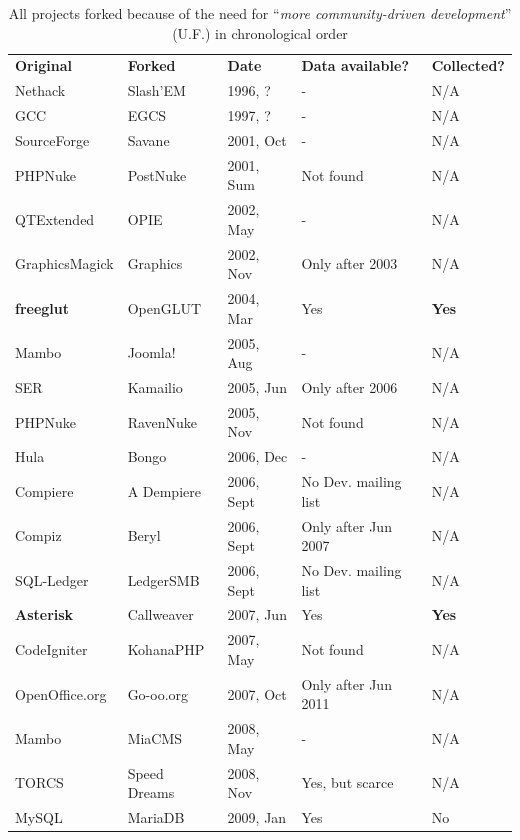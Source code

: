 \documentclass{acm_proc_article-sp}
\begin{document}
\begin{table} [!Ht]
\centering
\caption{All projects forked because of the need for ``\textit{more community-driven development}'' (U.F.) \cite{Robles} in chronological order}
\label{tableProjectsForkedCat2CommunityDriven}
\begin{tabular}{m{} m{} m{} m{} m{}}
\hline\noalign{\smallskip}
\textbf{Original} & \textbf{Forked} & \textbf{Date} & \textbf{Data available?} & \textbf{Collected?}\\
\noalign{\smallskip}\hline\noalign{\smallskip}
Nethack & Slash'EM & 1996, ? & - & N/A \\ \hline
GCC & EGCS & 1997, ? & - & N/A \\ \hline
SourceForge & Savane & 2001, Oct & - & N/A \\ \hline
PHPNuke & PostNuke & 2001, Sum & Not found & N/A \\ \hline
QTExtended & OPIE & 2002, May & - & N/A \\ \hline
GraphicsMagick & Graphics & 2002, Nov  & Only after 2003 & N/A \\ \hline
\textbf{freeglut} & OpenGLUT & 2004, Mar & Yes & \textbf{Yes} \\ \hline
Mambo & Joomla! & 2005, Aug & - & N/A \\ \hline
SER & Kamailio & 2005, Jun & Only after 2006 & N/A \\ \hline
PHPNuke & RavenNuke & 2005, Nov & Not found & N/A \\ \hline
Hula & Bongo & 2006, Dec & - & N/A \\ \hline
Compiere & A Dempiere & 2006, Sept & No Dev. mailing list & N/A \\ \hline
Compiz & Beryl & 2006, Sept & Only after Jun 2007 & N/A \\ \hline
SQL-Ledger & LedgerSMB & 2006, Sept & No Dev. mailing list & N/A \\ \hline
\textbf{Asterisk} & Callweaver & 2007, Jun & Yes & \textbf{Yes} \\ \hline
CodeIgniter & KohanaPHP & 2007, May & Not found & N/A \\ \hline
OpenOffice.org & Go-oo.org & 2007, Oct & Only after Jun 2011 & N/A \\ \hline
Mambo & MiaCMS & 2008, May & - & N/A \\ \hline
TORCS & Speed Dreams & 2008, Nov & Yes, but scarce & N/A \\ \hline
MySQL & MariaDB & 2009, Jan & Yes & No\\ \hline

\end{tabular}
\end{table}
\end{document}
